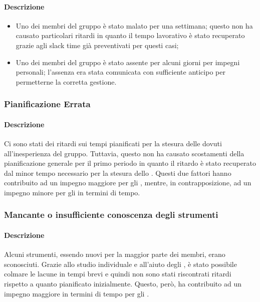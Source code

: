 \paragraph {Descrizione}
\begin{itemize}
	\item Uno dei membri del gruppo è stato malato per una settimana; questo non ha causato particolari ritardi in quanto il tempo lavorativo è stato recuperato grazie agli slack time già preventivati per questi casi;
	\item Uno dei membri del gruppo è stato assente per alcuni giorni per impegni personali; l'assenza era stata comunicata con sufficiente anticipo per permetterne la corretta gestione.
\end{itemize}

\subsubsection{Pianificazione Errata}
\paragraph{Descrizione}
Ci sono stati dei ritardi sui tempi pianificati per la stesura delle \NdP{} dovuti all'inesperienza del gruppo. Tuttavia, questo non ha causato scostamenti della pianificazione generale per il primo periodo in quanto il ritardo è stato recuperato dal minor tempo necessario per la stesura dello \SdF{}. Questi due fattori hanno contribuito ad un impegno maggiore per gli \adms{}, mentre, in contrapposizione, ad un impegno minore per gli \anas{} in termini di tempo.

\subsubsection{Mancante o insufficiente conoscenza degli strumenti}
\paragraph {Descrizione}
Alcuni strumenti, essendo nuovi per la maggior parte dei membri, erano sconosciuti. Grazie allo studio individuale e all'aiuto degli \adms{}, è stato possibile colmare le lacune in tempi brevi e quindi non sono stati riscontrati ritardi rispetto a quanto pianificato inizialmente. Questo, però, ha contribuito ad un impegno maggiore in termini di tempo per gli \adms{}.